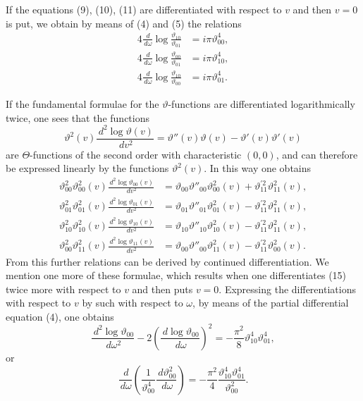 \documentclass[11pt]{article}
\providecommand{\dd}{\,d}
\providecommand{\tht}{\vartheta}
\begin{document}
If the equations (9), (10), (11) are differentiated with respect to $v$ and then $v=0$ is put, we obtain by means of (4) and (5) the relations
\begin{align}
4\frac{\dd}{\dd\omega}\log\frac{\tht_{10}}{\tht_{01}}&=i\pi\tht_{00}^{4}, \tag{12}\\
4\frac{\dd}{\dd\omega}\log\frac{\tht_{00}}{\tht_{01}}&=i\pi\tht_{10}^{4}, \tag{13}\\
4\frac{\dd}{\dd\omega}\log\frac{\tht_{10}}{\tht_{00}}&=i\pi\tht_{01}^{4}. \tag{14}
\end{align}

If the fundamental formulae for the $\vartheta$-functions are differentiated logarithmically twice, one sees that the functions
\[
\tht^2(v)\frac{\dd^2\log\tht(v)}{\dd v^2}
=\tht''(v)\tht(v)-\tht'(v)\tht'(v)
\]
are $\Theta$-functions of the second order with characteristic $(0,0)$, and can therefore be expressed linearly by the functions $\tht^2(v)$. In this way one obtains
\begin{align}
\tht_{00}^{2}\tht_{00}^{2}(v)\frac{\dd^2\log\tht_{00}(v)}{\dd v^2}
&=\tht_{00}\tht''_{00}\tht_{00}^{2}(v)+\tht_{11}^{\prime 2}\tht_{11}^{2}(v), \tag{15}\\
\tht_{01}^{2}\tht_{01}^{2}(v)\frac{\dd^2\log\tht_{01}(v)}{\dd v^2}
&=\tht_{01}\tht''_{01}\tht_{01}^{2}(v)-\tht_{11}^{\prime 2}\tht_{11}^{2}(v), \tag{16}\\
\tht_{10}^{2}\tht_{10}^{2}(v)\frac{\dd^2\log\tht_{10}(v)}{\dd v^2}
&=\tht_{10}\tht''_{10}\tht_{10}^{2}(v)-\tht_{11}^{\prime 2}\tht_{11}^{2}(v), \tag{17}\\
\tht_{00}^{2}\tht_{11}^{2}(v)\frac{\dd^2\log\tht_{11}(v)}{\dd v^2}
&=\tht_{00}\tht''_{00}\tht_{11}^{2}(v)-\tht_{11}^{\prime 2}\tht_{00}^{2}(v). \tag{18}
\end{align}
From this further relations can be derived by continued differentiation. We mention one more of these formulae, which results when one differentiates (15) twice more with respect to $v$ and then puts $v=0$. Expressing the differentiations with respect to $v$ by such with respect to $\omega$, by means of the partial differential equation (4), one obtains
\[
\frac{\dd^2\log\tht_{00}}{\dd\omega^2}-2\left(\frac{\dd\log\tht_{00}}{\dd\omega}\right)^2
=-\frac{\pi^2}{8}\tht_{10}^{4}\tht_{01}^{4},
\]
or
\begin{equation}
\frac{\dd}{\dd\omega}\left(\frac{1}{\tht_{00}^{4}}\frac{\dd\tht_{00}^{2}}{\dd\omega}\right)
=-\frac{\pi^2}{4}\frac{\tht_{10}^{4}\tht_{01}^{4}}{\tht_{00}^{2}}.
\tag{19}
\end{equation}
\end{document}
